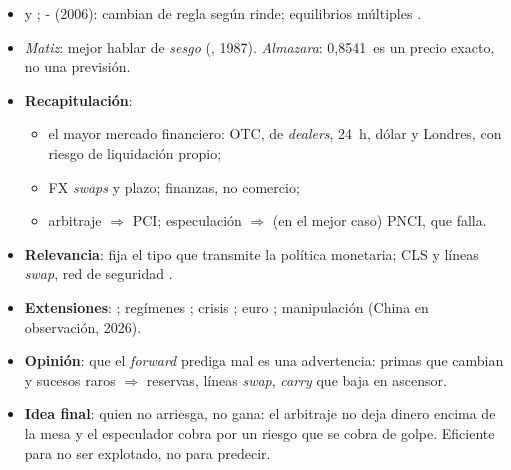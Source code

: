\documentclass{article}
\begin{document}
\begin{columnas}
\begin{enumerate}
  \begin{itemize}
  \item {} y ; - (2006): cambian de regla según rinde; equilibrios múltiples .
  \end{itemize}
\end{enumerate}
\begin{itemize}
\item \emph{Matiz}: mejor hablar de \emph{sesgo} (, 1987). \emph{Almazara}: 0,8541~es un precio exacto, no una previsión.
\end{itemize}

\begin{itemize}
\item \textbf{Recapitulación}:
  \begin{itemize}
  \item el mayor mercado financiero: OTC, de \emph{dealers}, 24~h, dólar y Londres, con riesgo de liquidación propio;
  \item FX \emph{swaps} y plazo; finanzas, no comercio;
  \item arbitraje $\Rightarrow$ PCI; especulación $\Rightarrow$ (en el mejor caso) PNCI, que falla.
  \end{itemize}
\item \textbf{Relevancia}: fija el tipo que transmite la política monetaria; CLS y líneas \emph{swap}, red de seguridad .
\item \textbf{Extensiones}:  ; regímenes ; crisis ; euro ; manipulación (China en observación, 2026).
\item \textbf{Opinión}: que el \emph{forward} prediga mal es una advertencia: primas que cambian y sucesos raros $\Rightarrow$ reservas, líneas \emph{swap}, \emph{carry} que baja en ascensor.
\item \textbf{Idea final}: quien no arriesga, no gana: el arbitraje no deja dinero encima de la mesa y el especulador cobra por un riesgo que se cobra de golpe. Eficiente para no ser explotado, no para predecir.
\end{itemize}


\end{columnas}
\end{document}
